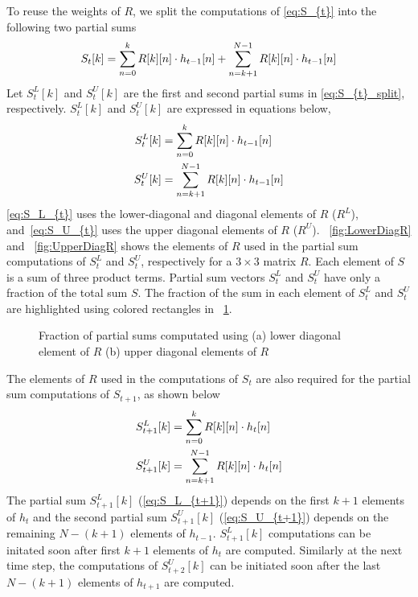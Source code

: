 To reuse the weights of $R$, we split the computations of \eqref{eq:S_{t}} into the following two partial sums 
\begin{align}\label{eq:S_{t}_split}
	S_{t}[k] = \sum_{n=0}^{k}R[k][n]\cdot h_{t-1}[n] + \sum_{n=k+1}^{N-1}R[k][n]\cdot h_{t-1}[n]
\end{align}
Let $S_{t}^{L}[k]$ and $S_{t}^{U}[k]$ are the first and second partial sums in \eqref{eq:S_{t}_split}, respectively.  $S_{t}^{L}[k]$ and $S_{t}^{U}[k]$ are expressed in equations below, 
\begin{align}
	S_{t}^{L}[k] &= \sum_{n=0}^{k}R[k][n]\cdot h_{t-1}[n] \label{eq:S_L_{t}}\\
	S_{t}^{U}[k] &= \sum_{n=k{+}1}^{N-1}R[k][n]\cdot h_{t-1}[n] \label{eq:S_U_{t}}
\end{align}
\eqref{eq:S_L_{t}} uses the lower-diagonal and diagonal elements of $R$ ($R^L$), and~\eqref{eq:S_U_{t}} uses the upper diagonal elements of $R$ ($R^U$). \figurename{~\ref{fig:LowerDiagR}} and \figurename{~\ref{fig:UpperDiagR}} shows the elements of $R$ used in the partial sum computations of $S_{t}^{L}$ and $S_{t}^{U}$, respectively for a $3\times3$ matrix $R$. Each element of $S$ is a sum of three product terms. Partial sum vectors $S^L_t$ and $S^U_t$ have only a fraction of the total sum $S$. The fraction of the sum in each element of $S^L_t$ and $S^U_t$ are highlighted using colored rectangles in \figurename{~\ref{fig:partialSumComputations}}.
\begin{figure}[htb!]
	\centering
	\hspace{2.0em}
	\caption{Fraction of partial sums computated using (a) lower diagonal element of $R$  (b) upper diagonal elements of $R$ }
	\label{fig:partialSumComputations}
\end{figure}

The elements of $R$ used in the computations of $S_{t}$ are also required for the partial sum computations of $S_{t{+}1}$, as shown below
\begin{align}
	S_{t{+}1}^{L}[k] &= \sum_{n=0}^{k}R[k][n]\cdot h_{t}[n] \label{eq:S_L_{t+1}}\\
	S_{t{+}1}^{U}[k] &= \sum_{n=k{+}1}^{N-1}R[k][n]\cdot h_{t}[n] \label{eq:S_U_{t+1}}
\end{align}
The partial sum $S_{t{+}1}^{L}[k]$ (\eqref{eq:S_L_{t+1}}) depends on the first $k{+}1$ elements of $h_{t}$ and the second partial sum $S_{t{+}1}^{U}[k]$ (\eqref{eq:S_U_{t+1}}) depends on the remaining $N{-}(k{+}1)$ elements of $h_{t-1}$. $S_{t{+}1}^{L}[k]$ computations can be initated soon after first $k{+}1$ elements of $h_{t}$ are computed. Similarly at the next time step, the computations of $S^U_{t{+}2}[k]$ can be initiated soon after the last $N{-}(k{+}1)$ elements of $h_{t{+}1}$ are computed. 


